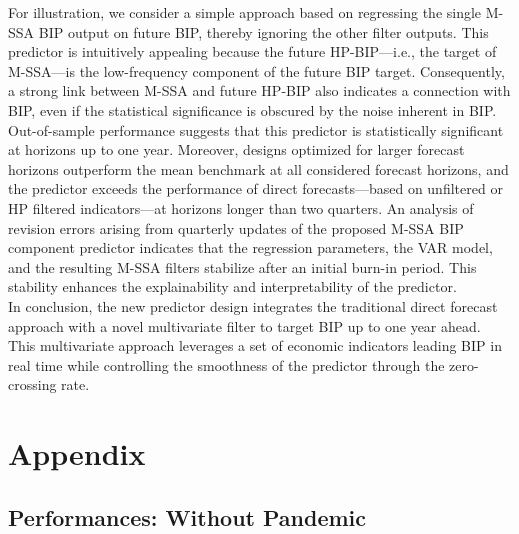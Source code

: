 \documentclass[a4paper]{article}
\begin{document}
For illustration, we consider a simple approach based on regressing the single M-SSA BIP output on future BIP, thereby ignoring the other filter outputs. This predictor is intuitively appealing because the future HP-BIP—i.e., the target of M-SSA—is the low-frequency component of the future BIP target. Consequently, a strong link between M-SSA and future HP-BIP also indicates a connection with BIP, even if the statistical significance is obscured by the noise inherent in BIP. Out-of-sample performance suggests that this predictor is statistically significant at horizons up to one year. Moreover, designs optimized for larger forecast horizons outperform the mean benchmark at all considered forecast horizons, and the predictor exceeds the performance of direct forecasts—based on unfiltered or HP filtered indicators—at horizons longer than two quarters. An analysis of revision errors arising from quarterly updates of the proposed M-SSA BIP component predictor indicates that the regression parameters, the VAR model, and the resulting M-SSA filters stabilize after an initial burn-in period. This stability enhances the explainability and interpretability of the predictor.\\

In conclusion, the new predictor design integrates the traditional direct forecast approach with a novel multivariate filter to target BIP up to one year ahead. This multivariate approach leverages a set of economic indicators leading BIP in real time while controlling the smoothness of the predictor through the zero-crossing rate. 

\newpage

\section{Appendix}

\subsection{Performances: Without Pandemic}
\end{document}
